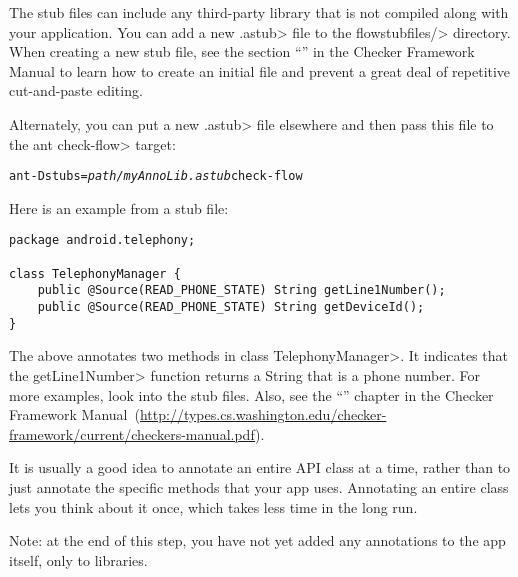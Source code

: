 The stub files can include any third-party library that is not compiled
along with your application.  You can add a new \<.astub> file to the
\<flowstubfiles/> directory. When creating a new stub file, see the section
``'' in the Checker Framework Manual to learn how to create an
initial file and prevent a great deal of repetitive cut-and-paste editing.

Alternately, you can put a new \<.astub> file elsewhere and then pass this
file to the \<ant check-flow> target:

\begin{alltt}
ant -Dstubs=\emph{path/myAnnoLib.astub} check-flow
\end{alltt}

Here is an example from a stub file:

\begin{Verbatim}
package android.telephony;

class TelephonyManager {
    public @Source(READ_PHONE_STATE) String getLine1Number();
    public @Source(READ_PHONE_STATE) String getDeviceId();
}
\end{Verbatim}

\noindent
The above annotates two methods in class \<TelephonyManager>.
It indicates that the \<getLine1Number> function returns a String that is a
phone number.  For more examples, look into the stub files. Also, see 
the
``'' chapter in the Checker Framework Manual\ifhevea\else\ (\url{http://types.cs.washington.edu/checker-framework/current/checkers-manual.pdf})\fi.




It is usually a good idea to annotate an entire API class at a time, rather
than to just annotate the specific methods that your app uses.  Annotating
an entire class lets you think about it once, which takes less time in the
long run. 


Note: at the end of this step, you have not yet added any annotations to
the app itself, only to libraries.

